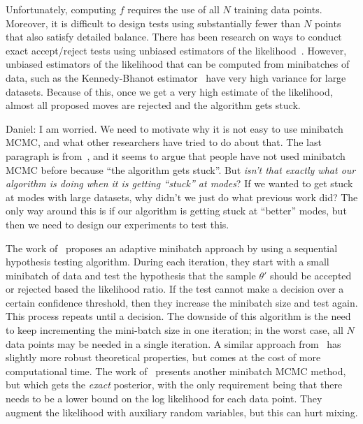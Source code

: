 \documentclass{article}
\begin{document}
Unfortunately, computing $f$ requires the use of all $N$ training data points. Moreover, it is
difficult to design tests using substantially fewer than $N$ points that also satisfy detailed
balance. There has been research on ways to conduct exact accept/reject tests using unbiased
estimators of the likelihood~\cite{Andrieu09thepseudo-marginal}. However, unbiased estimators of the
likelihood that can be computed from minibatches of data, such as the Kennedy-Bhanot
estimator~\cite{PhysRevD} have very high variance for large datasets. Because of this, once we get a
very high estimate of the likelihood, almost all proposed moves are rejected and the algorithm gets
stuck.

{\color{blue}
Daniel: I am worried. We need to motivate why it is not easy to use minibatch MCMC, and what other
researchers have tried to do about that.  The last paragraph is from~\cite{cutting_mh_2014}, and it
seems to argue that people have not used minibatch MCMC before because ``the algorithm gets stuck''.
But \emph{isn't that exactly what our algorithm is doing when it is getting ``stuck'' at modes}? If
we wanted to get stuck at modes with large datasets, why didn't we just do what previous work did?
The only way around this is if our algorithm is getting stuck at ``better'' modes, but then we need
to design our experiments to test this.
}

The work of~\cite{cutting_mh_2014} proposes an adaptive minibatch approach by using a sequential
hypothesis testing algorithm. During each iteration, they start with a small minibatch of data and
test the hypothesis that the sample $\theta'$ should be accepted or rejected based the likelihood
ratio. If the test cannot make a decision over a certain confidence threshold, then they increase
the minibatch size and test again. This process repeats until a decision.  The downside of this
algorithm is the need to keep incrementing the mini-batch size in one iteration; in the worst case,
all $N$ data points may be needed in a single iteration. A similar approach
from~\cite{icml2014c1_bardenet14} has slightly more robust theoretical properties, but comes at the
cost of more computational time. The work of~\cite{conf/uai/MaclaurinA14} presents another minibatch
MCMC method, but which gets the \emph{exact} posterior, with the only requirement being that there
needs to be a lower bound on the log likelihood for each data point. They augment the likelihood
with auxiliary random variables, but this can hurt mixing.
\end{document}
